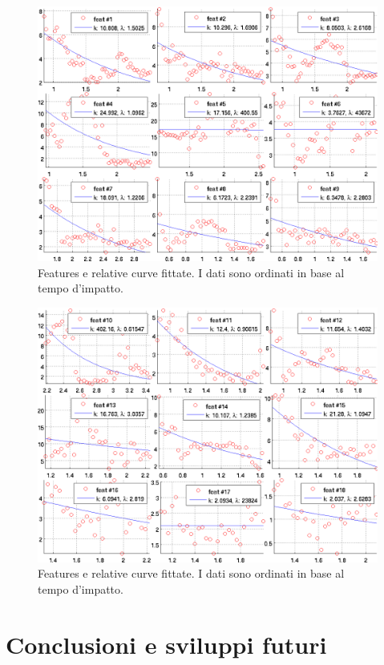 \documentclass[12pt]{report}
\begin{document}
\begin{figure}
	\includegraphics[scale=.9, angle=90]{images/feats01}
	\caption[Short]{Features e relative curve fittate. I dati sono ordinati in base al tempo d'impatto.}
	\label{fig:feats01}
\end{figure}

\begin{figure}
	\includegraphics[scale=.9, angle=90]{images/feats02}
	\caption[Short]{Features e relative curve fittate. I dati sono ordinati in base al tempo d'impatto.}
	\label{fig:feats02}
\end{figure}


\chapter{Conclusioni e sviluppi futuri}
\end{document}
